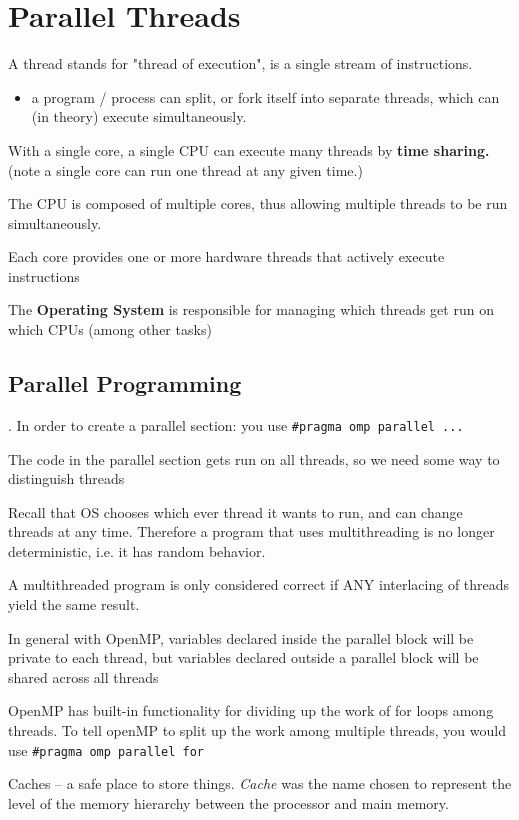 \documentclass[12pt]{article}
\begin{document}
\section*{Parallel Threads}
\begin{definition}[Threads]
    A thread stands for "thread of execution", is a single stream of instructions.
    \begin{itemize}
        \item a program / process can split, or fork itself into separate threads, which can (in theory) execute simultaneously.
    \end{itemize}
    With a single core, a single CPU can execute many threads by \textbf{time sharing.} (note a single core can run one thread at any given time.)

    The CPU is composed of multiple cores, thus allowing multiple threads to be run simultaneously.
\end{definition}
Each core provides one or more hardware threads that actively execute instructions

The \textbf{Operating System} is responsible for managing which threads get run on which CPUs (among other tasks)

\subsection*{Parallel Programming}. In order to create a parallel section: you use \lstinline{#pragma omp parallel ... }

The code in the parallel section gets run on all threads, so we need some way to distinguish threads

Recall that OS chooses which ever thread it wants to run, and can change threads at any time. Therefore a program that uses multithreading is no longer deterministic, i.e. it has random behavior.

A multithreaded program is only considered correct if ANY interlacing of threads yield the same result.

In general with OpenMP, variables declared inside the parallel block will be private to each thread, but variables declared outside a parallel block will be shared across all threads

OpenMP has built-in functionality for dividing up the work of for loops among threads. To tell openMP to split up the work among multiple threads, you would use \lstinline{#pragma omp parallel for}


Caches – a safe place to store things. \emph{Cache} was the name chosen to represent the level of the memory hierarchy between the processor and main memory.
\end{document}
